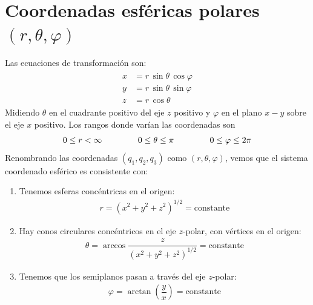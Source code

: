 \section{Coordenadas esféricas polares \texorpdfstring{$(r, \theta, \varphi)$}{(r, t, v)}}

Las ecuaciones de transformación son:
\begin{align}
\begin{aligned}
x &= r \, \sin \theta \, \cos \varphi \\
y &= r \, \sin \theta \, \sin \varphi \\
z &= r \, \cos \theta
\end{aligned}
\label{eq:ecuacion_02_038}
\end{align}
Midiendo $\theta$ en el cuadrante positivo del eje $z$ positivo y $\varphi$ en el plano $x-y$ sobre el eje $x$ positivo. Los rangos donde varían las coordenadas son
\begin{align*}
0 \leq r < \infty \hspace{1.5cm} 0 \leq \theta \leq \pi \hspace{1.5cm} 0 \leq \varphi \leq 2 \pi
\end{align*}
Renombrando las coordenadas $(q_{1}, q_{2}, q_{3})$ como $(r, \theta, \varphi)$, vemos que el sistema coordenado esférico es consistente con:
\begin{enumerate}
\item Tenemos esferas concéntricas en el origen:
\begin{align*}
r = (x^{2} + y^{2} + z^{2})^{1/2} =  \text{constante}
\end{align*}
\item Hay conos circulares concéntricos en el eje $z$-polar, con vértices en el origen:
\begin{align*}
\theta = \arccos \dfrac{z}{(x^{2} +y^{2} + z^{2})^{1/2}} = \text{constante}
\end{align*}
\item Tenemos que los semiplanos pasan a través del eje $z$-polar:
\begin{align*}
\varphi = \arctan\left(\dfrac{y}{x} \right) =  \text{constante}
\end{align*}
\end{enumerate}
